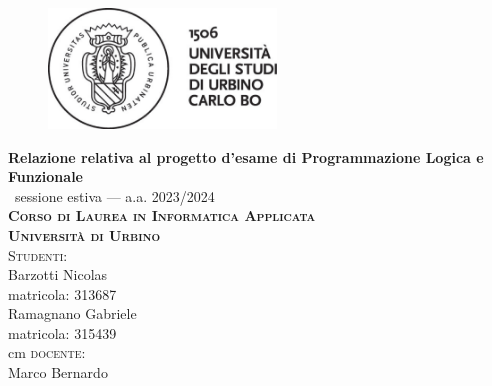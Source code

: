 \documentclass{article}
\begin{document}

\begin{titlepage}
	\centering
	\begin{figure}
	\vspace{2.5cm}
    \centerline{\includegraphics[height=3.2cm]{Resources/logo-uniurb-2016.jpg.eps}}
    \end{figure}
	\vspace*{\baselineskip}
	\LARGE{\bfseries Relazione relativa al progetto d'esame di Programmazione Logica e Funzionale }\\
	\Large{\ sessione estiva --- a.a. 2023/2024}\\ [0.6cm]
	\large{\textbf{\scshape{Corso di Laurea in Informatica Applicata\\ Università di Urbino}}}\\[3cm]
		{\large {\scshape Studenti:}\\[0.3cm] Barzotti Nicolas\\matricola: 313687\\
        Ramagnano Gabriele\\matricola: 315439}\\
         cm
	     \large{{\scshape docente:} \\[0.3cm] Marco Bernardo}\\[1.3cm]
	
\end{titlepage}

\index 
\tableofcontents

   
 



\end{document}
